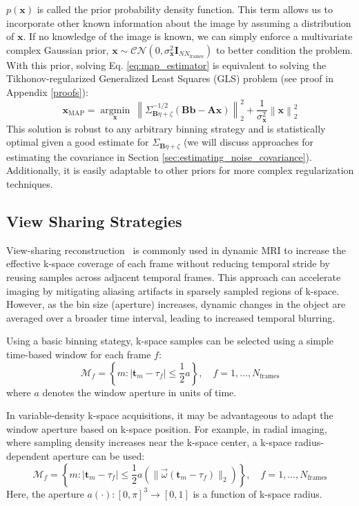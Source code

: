 \documentclass[11pt]{article}
\begin{document}
$p(\mathbf{x})$ is called the prior probability density function.
This term allows us to incorporate other known information about the image by assuming a distribution of $\mathbf{x}$.
If no knowledge of the image is known, we can simply enforce a multivariate complex Gaussian prior, $\mathbf{x} \sim \mathcal{CN}(0,\sigma_\mathbf{x}^2\mathbf{I}_{NN_\mathrm{frames}})$ to better condition the problem.
With this prior, solving Eq. \ref{eq:map_estimator} is equivalent to solving the Tikhonov-regularized Generalized Least Squares (GLS) problem (see proof in Appendix \ref{proofs}):
\begin{equation} \label{eq:map_gls_sol}
    \mathbf{x}_\mathrm{MAP} = \underset{\mathbf{x}}{\operatorname{argmin}}\
        \left\|\Sigma_{\mathbf{B} \eta + \zeta}^{-1/2}(\mathbf{B} \mathbf{b} - \mathbf{A}\mathbf{x})\right\|_2^2
        + \frac{1}{\sigma_{\mathbf{x}}^2}\left\|\mathbf{x}\right\|_2^2
\end{equation}
This solution is robust to any arbitrary binning strategy and is statistically optimal given a good estimate for $\Sigma_{\mathbf{B}\eta + \zeta}$ (we will discuss approaches for estimating the covariance in Section \ref{sec:estimating_noise_covariance}).
Additionally, it is easily adaptable to other priors for more complex regularization techniques.

\subsection{View Sharing Strategies}
View-sharing reconstruction~\cite{riederer_1988} is commonly used in dynamic MRI to increase the effective k-space coverage of each frame without reducing temporal stride by reusing samples across adjacent temporal frames.
This approach can accelerate imaging by mitigating aliasing artifacts in sparsely sampled regions of k-space.
However, as the bin size (aperture) increases, dynamic changes in the object are averaged over a broader time interval, leading to increased temporal blurring.

Using a basic binning stategy, k-space samples can be selected using a simple time-based window for each frame $f$:
\begin{equation*}
    \mathcal{M}_f = \left\{m: |\mathbf{t}_m - \tau_f| \leq \frac{1}{2} a \right\}, \quad f = 1, \ldots, N_\mathrm{frames}
\end{equation*}
where $a$ denotes the window aperture in units of time.

In variable-density k-space acquisitions, it may be advantageous to adapt the window aperture based on k-space position.
For example, in radial imaging, where sampling density increases near the k-space center, a k-space radius-dependent aperture can be used:
\begin{equation} \label{eq:binning_stategy}
    \mathcal{M}_f = \left\{m: |\mathbf{t}_m - \tau_f| \leq \frac{1}{2}a\left(\|\vec{\omega}(\mathbf{t}_m - \tau_f)\|_2\right) \right\}, \quad f = 1, \ldots, N_\mathrm{frames}
\end{equation}
Here, the aperture $a(\cdot): [0,\pi]^{3} \to [0,1]$ is a function of k-space radius.
\end{document}
